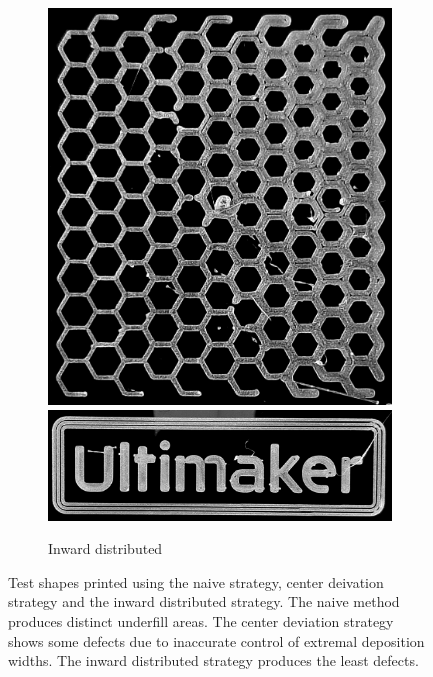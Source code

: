\begin{figure}
\begin{subfigure}{\figwidth}
\includegraphics[height=\figheight]{sources/applications/P3_print_hex_inward_edited.png}
\includegraphics[width=\figwidth]{sources/applications/P3_print_UM_inward_edited.png}
\caption{Inward distributed}\label{print_inward}
\end{subfigure}
\caption{
Test shapes printed using the naive strategy, center deivation strategy and the inward distributed strategy.
The naive method produces distinct underfill areas.
The center deviation strategy shows some defects due to inaccurate control of extremal deposition widths.
The inward distributed strategy produces the least defects.
}
\label{prints}
\end{figure}

